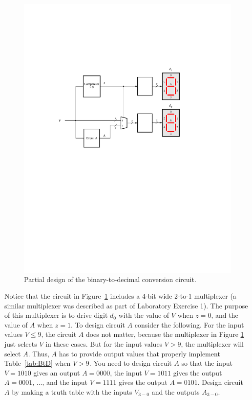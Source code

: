 \documentclass[epsfig,10pt,fullpage]{article}
\begin{document}
\begin{figure}[H]
	\begin{center}
		\includegraphics[]{figures/figure1.pdf}
	\end{center}
\caption{Partial design of the binary-to-decimal conversion circuit.}
\label{fig:fig1}
\end{figure}

Notice that the circuit in Figure~\ref{fig:fig1} includes a 4-bit wide 2-to-1 multiplexer (a similar multiplexer
was described as part of Laboratory Exercise 1). The purpose of this multiplexer is to 
drive digit $d_0$ with the value of $V$ when $z=0$, and the value of $A$ when $z=1$.
To design circuit $A$ consider the following. For the input values $V \le 9$, the circuit $A$
does not matter, because the multiplexer in Figure \ref{fig:fig1} just selects $V$ in
these cases. But for the input values $V > 9$, the multiplexer will select $A$.
Thus, $A$ has to provide output values that properly implement 
Table~\ref{tab:BtD} when $V > 9$.  You need to design circuit $A$ so that the input $V = 1010$ gives 
an output $A = 0000$, the input $V = 1011$ gives the output $A = 0001$, $\ldots$, and the 
input $V = 1111$ gives the output $A = 0101$.  Design circuit $A$ by making a truth table with 
the inputs $V_{3-0}$ and the outputs $A_{3-0}$.
\end{document}
